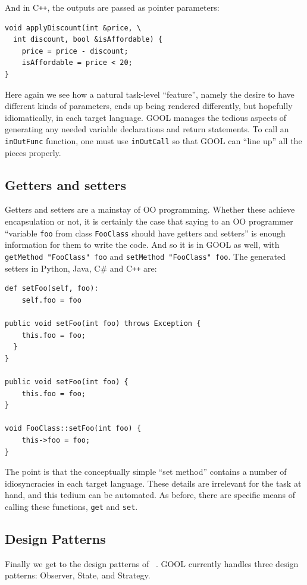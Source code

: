\documentclass[sigplan,review,prologue,dvipsnames]{acmart}
\newcommand{\Csharp}{C\#}
\newcommand{\Cplusplus}{C\texttt{++}}
\begin{document}
And in \Cplusplus, the outputs are passed as pointer parameters:
\begin{lstlisting}
void applyDiscount(int &price, \
  int discount, bool &isAffordable) {
    price = price - discount;
    isAffordable = price < 20;
}
\end{lstlisting}
Here again we see how a natural task-level ``feature'', namely the
desire to have different kinds of parameters, ends up being rendered 
differently,
but hopefully idiomatically, in each target language.  GOOL manages the
tedious aspects of generating any needed variable declarations and return
statements.  To call an \verb|inOutFunc| function, one must use
\verb|inOutCall| so that GOOL can ``line up'' all the pieces properly.

\subsection{Getters and setters}

Getters and setters are a mainstay of OO programming.  Whether these achieve
encapsulation or not, it is certainly the case that saying to an OO programmer
``variable \verb|foo| from class \verb|FooClass| should have getters and setters''
is enough information for them to write the code. And so it is in GOOL as well,
with \verb|getMethod "FooClass" foo| and \verb|setMethod "FooClass" foo|. 
The generated setters in Python, Java, \Csharp{} and \Cplusplus{} are:
\begin{lstlisting}
def setFoo(self, foo):
    self.foo = foo
    
public void setFoo(int foo) throws Exception {
    this.foo = foo;
  }
}

public void setFoo(int foo) {
    this.foo = foo;
}

void FooClass::setFoo(int foo) {
    this->foo = foo;
}
\end{lstlisting}
The point is that the conceptually simple ``set method'' contains a number
of idiosyncracies in each target language. These details are irrelevant for
the task at hand, and this tedium can be automated. As before, there are
specific means of calling these functions, \verb|get| and \verb|set|.

\subsection{Design Patterns}
Finally we get to the design patterns of ~\cite{gamma1995design}. GOOL
currently handles three design patterns: Observer,
State, and Strategy. 
\end{document}
